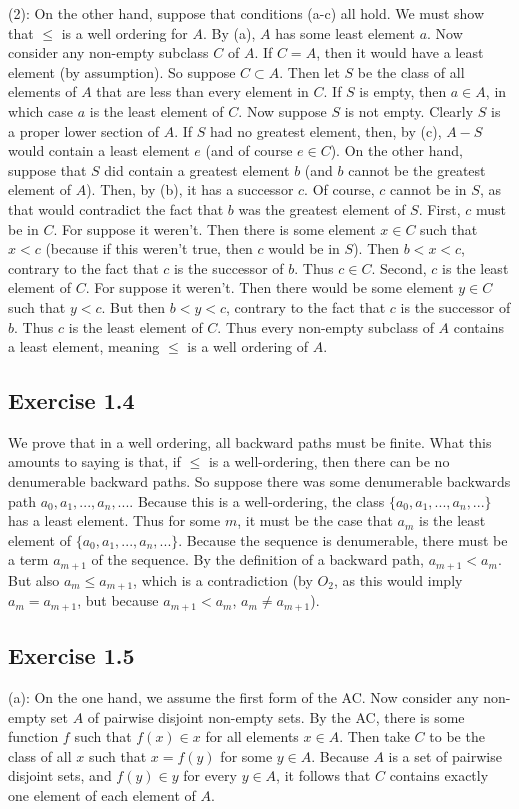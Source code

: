 \documentclass{article}
\theoremstyle{definition}
\begin{document}
(2): On the other hand, suppose that conditions (a-c) all hold. We must show that $\le$ is a well ordering for $A$. By (a), $A$ has some least element $a$. 
Now consider any non-empty subclass $C$ of $A$. If $C=A$, then it would have a least 
element (by assumption). So suppose $C\subset A$. Then let $S$ be the class of all elements of $A$ that are less than every element in $C$. If $S$ is empty, then $a\in A$, 
in which case $a$ is the least element of $C$. Now suppose $S$ is not empty. Clearly $S$ is a proper lower section of $A$. If $S$ had no greatest element, 
then, by (c), $A-S$ would contain a least element $e$ (and of course $e\in C$). On the other hand, suppose that $S$ did contain a greatest element $b$ (and $b$ cannot be the greatest element of 
$A$). Then, by (b), it has a successor $c$. Of course, $c$ cannot be in $S$, as that would contradict the fact that $b$ was the greatest element of $S$. 
First, $c$ must be in $C$. For suppose it weren't. Then there is some element $x\in C$ such that $x<c$ (because if this weren't true, then 
$c$ would be in $S$). Then $b<x<c$, contrary to the fact that $c$ is the successor of $b$. Thus $c\in C$. Second, $c$ is the least element of $C$. For suppose it weren't. Then there would be 
some element $y\in C$ such that $y<c$. But then $b<y<c$, contrary to the fact that $c$ is the successor of $b$. Thus $c$ is the least element of $C$. Thus every non-empty subclass of $A$ contains a least element, 
meaning $\le$ is a well ordering of $A$.

\subsection*{Exercise 1.4}
We prove that in a well ordering, all backward paths must be finite. What this amounts to saying is that, if $\le$ is a well-ordering, then 
there can be no denumerable backward paths. So suppose there was some denumerable backwards path $a_0,a_1,...,a_n,...$. Because this is a well-ordering, 
the class $\{a_0,a_1,...,a_n,...\}$ has a least element. Thus for some $m$, it must be the case that $a_m$ is the least element of 
$\{a_0,a_1,...,a_n,...\}$. Because the sequence is denumerable, there must be a term $a_{m+1}$ of the sequence. By the definition of a backward path, 
$a_{m+1}<a_m$. But also $a_m\le a_{m+1}$, which is a contradiction (by $O_2$, as this would imply $a_m=a_{m+1}$, but because 
$a_{m+1}<a_m$, $a_m\ne a_{m+1}$).

\subsection*{Exercise 1.5}
(a): On the one hand, we assume the first form of the AC. Now consider any non-empty set $A$ of pairwise disjoint non-empty sets. 
By the AC, there is some function $f$ such that $f(x)\in x$ for all elements $x\in A$. Then take $C$ to be the class of all $x$ such that 
$x=f(y)$ for some $y\in A$. Because $A$ is a set of pairwise disjoint sets, and $f(y)\in y$ for every $y\in A$, it follows that $C$ contains exactly one element of 
each element of $A$. 
\end{document}
